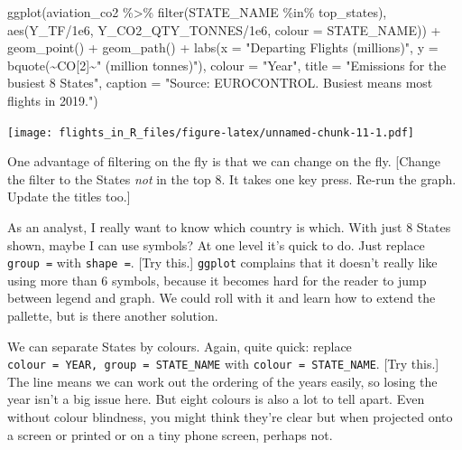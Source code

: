 \documentclass[
]{book}
\newenvironment{Shaded}{\begin{snugshade}}{\end{snugshade}}
\newcommand{\AttributeTok}[1]{\textcolor[rgb]{0.77,0.63,0.00}{#1}}
\newcommand{\DecValTok}[1]{\textcolor[rgb]{0.00,0.00,0.81}{#1}}
\newcommand{\FloatTok}[1]{\textcolor[rgb]{0.00,0.00,0.81}{#1}}
\newcommand{\FunctionTok}[1]{\textcolor[rgb]{0.00,0.00,0.00}{#1}}
\newcommand{\NormalTok}[1]{#1}
\newcommand{\SpecialCharTok}[1]{\textcolor[rgb]{0.00,0.00,0.00}{#1}}
\newcommand{\StringTok}[1]{\textcolor[rgb]{0.31,0.60,0.02}{#1}}
\begin{document}
\begin{Shaded}
\begin{Highlighting}[]
\FunctionTok{ggplot}\NormalTok{(aviation\_co2 }\SpecialCharTok{\%\textgreater{}\%} 
         \FunctionTok{filter}\NormalTok{(STATE\_NAME }\SpecialCharTok{\%in\%}\NormalTok{ top\_states), }
       \FunctionTok{aes}\NormalTok{(Y\_TF}\SpecialCharTok{/}\FloatTok{1e6}\NormalTok{, Y\_CO2\_QTY\_TONNES}\SpecialCharTok{/}\FloatTok{1e6}\NormalTok{, }
           \AttributeTok{colour =}\NormalTok{  STATE\_NAME)) }\SpecialCharTok{+}
  \FunctionTok{geom\_point}\NormalTok{() }\SpecialCharTok{+} 
  \FunctionTok{geom\_path}\NormalTok{() }\SpecialCharTok{+}
  \FunctionTok{labs}\NormalTok{(}\AttributeTok{x =} \StringTok{"Departing Flights (millions)"}\NormalTok{, }
       \AttributeTok{y =} \FunctionTok{bquote}\NormalTok{(}\SpecialCharTok{\textasciitilde{}}\NormalTok{CO[}\DecValTok{2}\NormalTok{]}\SpecialCharTok{\textasciitilde{}}\StringTok{" (million tonnes)"}\NormalTok{),}
       \AttributeTok{colour =} \StringTok{"Year"}\NormalTok{,}
       \AttributeTok{title =} \StringTok{"Emissions for the busiest 8 States"}\NormalTok{,}
       \AttributeTok{caption =} \StringTok{"Source: EUROCONTROL. \textquotesingle{}Busiest\textquotesingle{} means most flights in 2019."}\NormalTok{)}
\end{Highlighting}
\end{Shaded}

\texttt{[image: flights\_in\_R\_files/figure-latex/unnamed-chunk-11-1.pdf]}

One advantage of filtering on the fly is that we can change on the fly. {[}Change the filter to the States \emph{not} in the top 8. It takes one key press. Re-run the graph. Update the titles too.{]}

As an analyst, I really want to know which country is which. With just 8 States shown, maybe I can use symbols? At one level it's quick to do. Just replace \texttt{group\ =} with \texttt{shape\ =}. {[}Try this.{]} \texttt{ggplot} complains that it doesn't really like using more than 6 symbols, because it becomes hard for the reader to jump between legend and graph. We could roll with it and learn how to extend the pallette, but is there another solution.

We can separate States by colours. Again, quite quick: replace \texttt{colour\ =\ YEAR,\ group\ =\ STATE\_NAME} with \texttt{colour\ =\ STATE\_NAME}. {[}Try this.{]} The line means we can work out the ordering of the years easily, so losing the year isn't a big issue here. But eight colours is also a lot to tell apart. Even without colour blindness, you might think they're clear but when projected onto a screen or printed or on a tiny phone screen, perhaps not.
\end{document}
